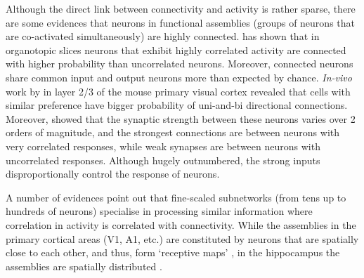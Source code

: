     Although the direct link between connectivity and activity is rather
    sparse, there are some evidences that neurons in functional assemblies
    (groups of neurons that are co-activated simultaneously) are highly
    connected. \cite{Takahashi2010} has shown that in organotopic slices
    neurons that exhibit highly correlated activity are connected with higher
    probability than uncorrelated neurons. Moreover, connected neurons share
    common input and output neurons more than expected by chance. {\it In-vivo}
    work by \cite{Ko2011} in layer 2/3 of the mouse primary visual cortex
    revealed that cells with similar preference have bigger probability of
    uni-and-bi directional connections. Moreover, \cite{Cossell2015} showed
    that the synaptic strength between these neurons varies over 2 orders of
    magnitude, and the strongest connections are between neurons with very
    correlated responses, while weak synapses are between neurons with
    uncorrelated responses. Although hugely outnumbered, the strong inputs
    disproportionally control the response of neurons. 

    A number of evidences point out that fine-scaled subnetworks (from tens up
    to hundreds of neurons) specialise in processing similar information where
    correlation in activity is correlated with connectivity. While the
    assemblies in the primary cortical areas (V1, A1, etc.) are constituted by
    neurons that are spatially close to each other, and thus, form `receptive
    maps' \cite[e.g.,][]{Bathellier2012, Cossell2015}, in the hippocampus the
    assemblies are spatially distributed \citep{Guzman2016}.

